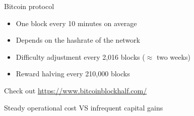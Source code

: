 \documentclass{beamer}
\begin{document}
\begin{frame}{Bitcoin protocol}
\begin{itemize}
  \item One block every 10 minutes on average
  \item Depends on the hashrate of the network
  \item Difficulty adjustment every 2,016 blocks ($\approx$ two weeks)
  \item Reward halving every 210,000 blocks
\end{itemize}
Check out \url{https://www.bitcoinblockhalf.com/}
\begin{tcolorbox}[enhanced,drop shadow, title=Risky business]
Steady operational cost VS infrequent capital gains
\end{tcolorbox}
\end{frame}
\end{document}
